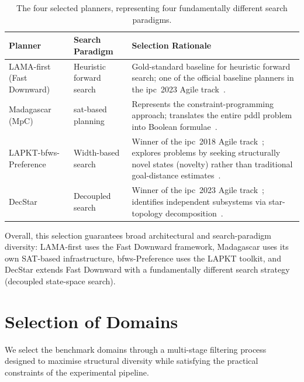 \begin{table}[htbp]
  \centering
  \caption{The four selected planners, representing four fundamentally different search paradigms.}
  \label{tab:selected_planners}
  \small
  \begin{tabular}{l l p{6.5cm}}
    \toprule
    \textbf{Planner} & \textbf{Search Paradigm} & \textbf{Selection Rationale} \\
    \midrule
    LAMA-first (Fast Downward) & Heuristic forward search & Gold-standard baseline for heuristic forward search; one of the official baseline planners in the \gls{ipc}~2023 Agile track~\cite{RichterWestphal2010, IPC2023Classical}. \\
    \addlinespace
    Madagascar (MpC) & \gls{sat}-based planning & Represents the constraint-programming approach; translates the entire \gls{pddl} problem into Boolean formulae~\cite{Rintanen2012}. \\
    \addlinespace
    LAPKT-\gls{bfws}-Preference & Width-based search & Winner of the \gls{ipc}~2018 Agile track~\cite{IPC2018Classical}; explores problems by seeking structurally novel states (novelty) rather than traditional goal-distance estimates~\cite{LipovetzkyGeffner2017}. \\
    \addlinespace
    DecStar & Decoupled search & Winner of the \gls{ipc}~2023 Agile track~\cite{IPC2023Classical}; identifies independent subsystems via star-topology decomposition~\cite{GnadHoffmann2018}. \\
    \bottomrule
  \end{tabular}
\end{table}

Overall, this selection guarantees broad architectural and search-paradigm diversity: LAMA-first uses the Fast Downward framework, Madagascar uses its own SAT-based infrastructure, \gls{bfws}-Preference uses the LAPKT toolkit, and DecStar extends Fast Downward with a fundamentally different search strategy (decoupled state-space search).


\section{Selection of Domains}
\label{sec:setup:domains}

We select the benchmark domains through a multi-stage filtering process designed to maximise structural diversity while satisfying the practical constraints of the experimental pipeline.

